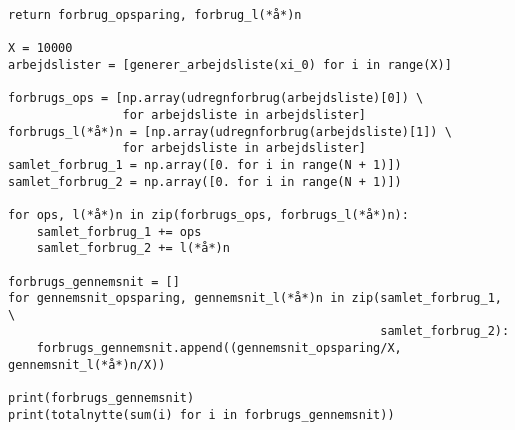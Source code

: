 \begin{lstlisting}[mathescape=true,caption={Python algoritme},label={kode:python}]
    return forbrug_opsparing, forbrug_l(*å*)n

X = 10000
arbejdslister = [generer_arbejdsliste(xi_0) for i in range(X)]

forbrugs_ops = [np.array(udregnforbrug(arbejdsliste)[0]) \
                for arbejdsliste in arbejdslister]
forbrugs_l(*å*)n = [np.array(udregnforbrug(arbejdsliste)[1]) \ 
                for arbejdsliste in arbejdslister]
samlet_forbrug_1 = np.array([0. for i in range(N + 1)])
samlet_forbrug_2 = np.array([0. for i in range(N + 1)])

for ops, l(*å*)n in zip(forbrugs_ops, forbrugs_l(*å*)n):
    samlet_forbrug_1 += ops
    samlet_forbrug_2 += l(*å*)n

forbrugs_gennemsnit = []
for gennemsnit_opsparing, gennemsnit_l(*å*)n in zip(samlet_forbrug_1, \
                                                    samlet_forbrug_2):
    forbrugs_gennemsnit.append((gennemsnit_opsparing/X, gennemsnit_l(*å*)n/X))

print(forbrugs_gennemsnit)
print(totalnytte(sum(i) for i in forbrugs_gennemsnit))

\end{lstlisting}

